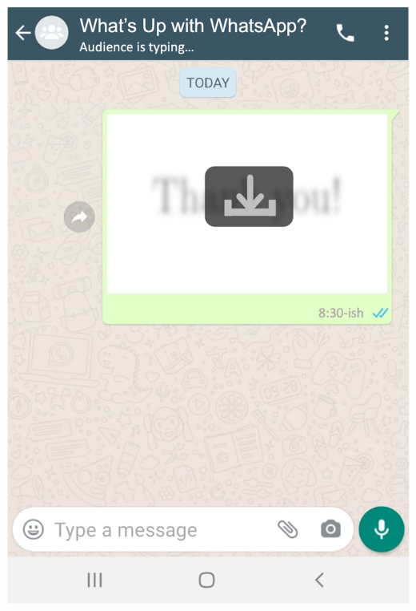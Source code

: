 \documentclass[usenames,dvipsnames,t]{beamer}
\begin{document}
\begin{frame}[plain]
\vspace{.6cm}
\centering 
\includegraphics[scale=.6]{thanks_apsa_blur}
\end{frame}
\end{document}
